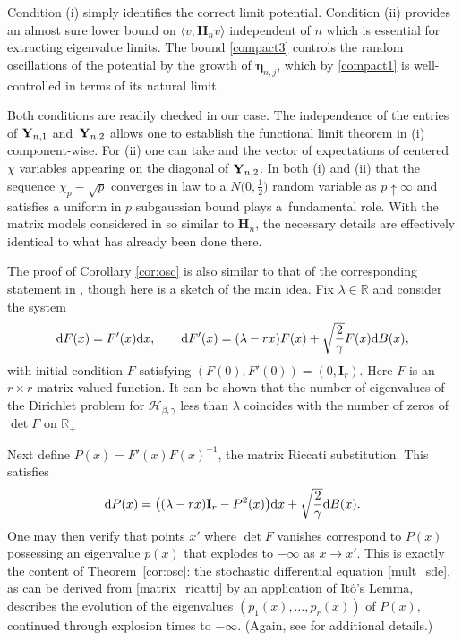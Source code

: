 \documentclass[pdftex]{sigma}
\numberwithin{equation}{section}
\theoremstyle{definition}
\newcommand{\R}{{\mathbb R}}
\newcommand{\nn}{\boldsymbol\eta}
\newcommand{\mbf}[1]{\mathbf{#1}}
\begin{document}
Condition (i) simply identifies the correct limit potential. Condition (ii) provides an almost sure lower bound on $\langle v, \mathbf{H}_n v \rangle$ independent of $n$ which is essential for extracting eigenvalue limits. The bound \eqref{compact3} controls the random oscillations of the potential by the growth of $\nn_{n,j}$, which by \eqref{compact1} is well-controlled in terms of its natural limit.

Both conditions are readily checked in our case. The independence of the entries of
${\bf{Y}}_{n,1}$ and~${\bf{Y}}_{n,2}$ allows one to establish the functional limit theorem in (i) component-wise. For (ii) one can take \smash{$\nn_{n,0} =0$} and \smash{$\nn_{n,2}$} the vector of expectations of centered $\chi$ variables appearing on the diagonal of ${\bf{Y}}_{n,2}$.
In both (i) and (ii) that the sequence $\chi_p -\sqrt{p}$ converges in
law to a $N\bigl(0,\frac{1}{2}\bigr)$ random variable as $p \uparrow \infty$ and satisfies a uniform in $p$ subgaussian bound plays a~fundamental role.
With the matrix models considered in \cite{Spike2} so similar to $\mathbf{H}_n$, the necessary details are effectively identical to what has already been done there.

The proof of Corollary \ref{cor:osc} is also similar to that of the
corresponding statement in \cite{Spike2}, though here is a sketch of the main idea. Fix $\lambda\in \R$ and consider the system
\begin{align}
{\rm d}F(x) = F'(x) {\rm d}x, \qquad
 {\rm d}F'(x) = (\lambda - r x) F(x) + \sqrt{\frac{2}{\gamma}} F (x) {\rm d}B(x),\label{Eig:system}
\end{align}
with initial condition $F$ satisfying $(F(0), F'(0)) = (0, \mbf{I}_r)$. Here $F$ is an $r\times r$ matrix valued function.
It can be shown that the number of eigenvalues of
the Dirichlet problem for $\mathcal{H}_{\beta, \gamma}$ less than $\lambda$ coincides with the number of zeros of $\det F$ on $\R_+$


Next define $P(x) = F'(x) F(x)^{-1} $, the matrix Riccati substitution. This satisfies
\begin{equation}
\label{matrix_ricatti}
{\rm d} P(x) = \bigl((\lambda - r x)\mbf{I}_r - P^2(x)\bigr){\rm d}x + \sqrt{\frac{2}{\gamma}} {\rm d}B(x).
\end{equation}
One may then verify that points $x'$ where $\det F$ vanishes correspond to $P(x)$ possessing an eigenvalue $p(x)$ that explodes to $-\infty$ as $x \rightarrow x'$. This is exactly the content of Theorem~\ref{cor:osc}: the stochastic differential equation \eqref{mult_sde}, as can be derived from \eqref{matrix_ricatti} by an application of It\^{o}'s Lemma, describes the evolution of the eigenvalues
$(p_1(x), \dots, p_r(x))$ of $P(x)$, continued through explosion times to $-\infty$. (Again, see \cite{Spike2} for additional details.)
\end{document}
